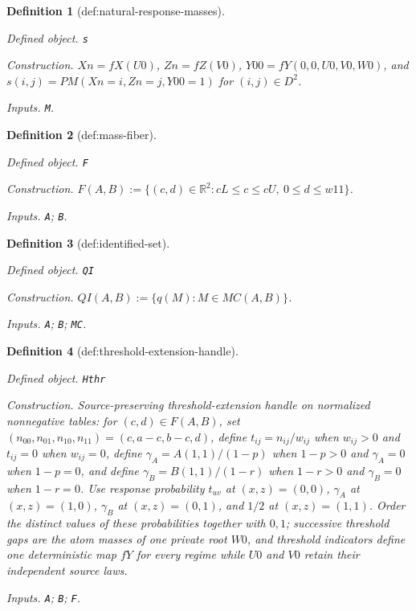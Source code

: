 \documentclass{article}
\newtheorem{definition}{Definition}
\begin{document}
\begin{definition}[def:natural-response-masses]\label{def:natural-response-masses}
\par\smallskip\noindent\emph{Defined object.} \texttt{s}
\par\smallskip\noindent\emph{Construction.} \(Xn=fX(U0)\), \(Zn=fZ(V0)\), \(Y00=fY(0,0,U0,V0,W0)\), and \(s(i,j)=PM(Xn=i,Zn=j,Y00=1)\) for \((i,j)\in D^2\).
\par\smallskip\noindent\emph{Inputs.} \texttt{M}.
\end{definition}

\begin{definition}[def:mass-fiber]\label{def:mass-fiber}
\par\smallskip\noindent\emph{Defined object.} \texttt{F}
\par\smallskip\noindent\emph{Construction.} \(F(A,B):=\{(c,d)\in\mathbb R^2:cL\le c\le cU,\ 0\le d\le w11\}\).
\par\smallskip\noindent\emph{Inputs.} \texttt{A}; \texttt{B}.
\end{definition}

\begin{definition}[def:identified-set]\label{def:identified-set}
\par\smallskip\noindent\emph{Defined object.} \texttt{QI}
\par\smallskip\noindent\emph{Construction.} \(QI(A,B):=\{q(M):M\in MC(A,B)\}\).
\par\smallskip\noindent\emph{Inputs.} \texttt{A}; \texttt{B}; \texttt{MC}.
\end{definition}

\begin{definition}[def:threshold-extension-handle]\label{def:threshold-extension-handle}
\par\smallskip\noindent\emph{Defined object.} \texttt{Hthr}
\par\smallskip\noindent\emph{Construction.} Source-preserving threshold-extension handle on normalized nonnegative tables: for \((c,d)\in F(A,B)\), set \((n_{00},n_{01},n_{10},n_{11})=(c,a-c,b-c,d)\), define \(t_{ij}=n_{ij}/w_{ij}\) when \(w_{ij}>0\) and \(t_{ij}=0\) when \(w_{ij}=0\), define \(\gamma_A=A(1,1)/(1-p)\) when \(1-p>0\) and \(\gamma_A=0\) when \(1-p=0\), and define \(\gamma_B=B(1,1)/(1-r)\) when \(1-r>0\) and \(\gamma_B=0\) when \(1-r=0\).  Use response probability \(t_{uv}\) at \((x,z)=(0,0)\), \(\gamma_A\) at \((x,z)=(1,0)\), \(\gamma_B\) at \((x,z)=(0,1)\), and \(1/2\) at \((x,z)=(1,1)\).  Order the distinct values of these probabilities together with \(0,1\); successive threshold gaps are the atom masses of one private root \(W0\), and threshold indicators define one deterministic map \(fY\) for every regime while \(U0\) and \(V0\) retain their independent source laws.
\par\smallskip\noindent\emph{Inputs.} \texttt{A}; \texttt{B}; \texttt{F}.
\end{definition}
\end{document}
